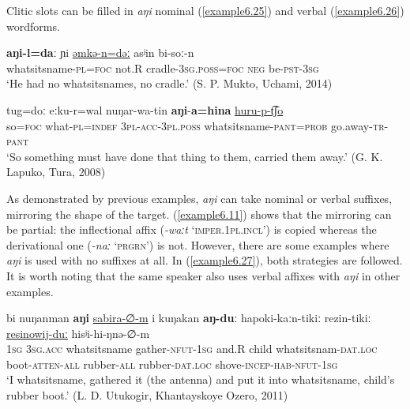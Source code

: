 \documentclass[output=paper,colorlinks,citecolor=brown]{langscibook}
\begin{document}
Clitic slots can be filled in \textit{aŋi} nominal (\ref{example6.25}) and verbal (\ref{example6.26}) wordforms.

\ea
    \label{example6.25}
    \gll \textbf{aŋi-l=daː}	ɲi	\uline{əmkə-n=dəː}	asʲin	bi-soː-n\\
    whatsitsname-\textsc{pl}=\textsc{foc}	not.R	cradle-\textsc{3sg.poss}=\textsc{foc}	\textsc{neg}	be-\textsc{pst}-3\textsc{sg}\\
    \glt `He had no whatsitsnames, no cradle.' (S. P. Mukto, Uchami, 2014)\\
    \z

\ea
    \label{example6.26}
    \gll tug=doː	eːku-r=wal	nuŋar-wa-tin	\textbf{aŋi}-\tS\textbf{a=hin}\tS\textbf{a} \uline{huru-p-t͡ʃo}\\
    so=\textsc{foc}	what-\textsc{pl}=\textsc{indef}	3\textsc{pl-acc-3pl.poss}	whatsitsname-\textsc{pant}=\textsc{prob} go.away-\textsc{tr}-\textsc{pant}\\
    \glt `So something must have done that thing to them, carried them away.' (G. K. Lapuko, Tura, 2008)\\
    \z


As demonstrated by previous examples, \textit{aŋi} can take nominal or verbal suffixes, mirroring the shape of the target. (\ref{example6.11}) shows that the mirroring can be partial: the inflectional affix (\textit{-waːt} ‘\textsc{imper.1pl.incl}’) is copied whereas the derivational one (\textit{-naː} ‘\textsc{prgrn}’) is not. However, there are some examples where \textit{aŋi} is used with no suffixes at all. In (\ref{example6.27}), both strategies are followed. It is worth noting that the same speaker also uses verbal affixes with \textit{aŋi} in other examples.

\ea
    \label{example6.27}
    \gll bi	nuŋanman	\textbf{aŋi} 	\uline{sabira-∅-m}	i	kuŋakan     \textbf{aŋ-duː}	hapoki-kaːn-tikiː	rezin-tikiː 	\uline{resinowij-duː}   hisʲi-hi-ŋnə-∅-m\\
    1\textsc{sg}	3\textsc{sg}.\textsc{acc}	whatsitsname	gather-\textsc{nfut}-1\textsc{sg}	and.R	child   whatsitsnam-\textsc{dat.loc}	boot-\textsc{atten}-\textsc{all}	rubber-\textsc{all}	rubber-\textsc{dat.loc}   shove-\textsc{incep}-\textsc{hab}-\textsc{nfut}-1\textsc{sg}\\
    \glt `I whatsitsname, gathered it (the antenna) and put it into whatsitsname, child’s rubber boot.' (L. D. Utukogir, Khantayskoye Ozero, 2011)\\
    \z
\end{document}
